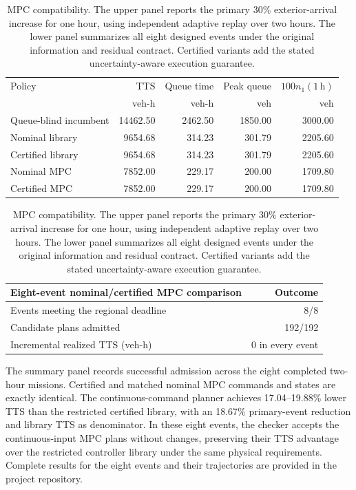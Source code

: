 \documentclass[journal,10pt]{IEEEtran}
\begin{document}
\begin{table}[t]
\centering
\caption{MPC compatibility. The upper panel reports the primary 30\%
exterior-arrival increase for one hour, using independent adaptive replay
over two hours. The lower panel summarizes all eight designed events under
the original information and residual contract. Certified variants add the
stated uncertainty-aware execution guarantee.}
\label{tab:new-incident-primary}
\small
\setlength{\tabcolsep}{4pt}
\begin{tabular}{@{}lrrrr@{}}
\toprule
Policy & TTS & Queue time & Peak queue & $100n_1(1\,\mathrm h)$\\
& veh-h & veh-h & veh & veh\\
\midrule
Queue-blind incumbent & 14462.50 & 2462.50 & 1850.00 & 3000.00\\
Nominal library & 9654.68 & 314.23 & 301.79 & 2205.60\\
Certified library & 9654.68 & 314.23 & 301.79 & 2205.60\\
Nominal MPC & 7852.00 & 229.17 & 200.00 & 1709.80\\
Certified MPC & 7852.00 & 229.17 & 200.00 & 1709.80\\
\bottomrule
\end{tabular}
\par\medskip
\begin{tabular}{@{}lr@{}}
\toprule
Eight-event nominal/certified MPC comparison & Outcome\\
\midrule
Events meeting the regional deadline & 8/8\\
Candidate plans admitted & 192/192\\
Incremental realized TTS (veh-h) & 0 in every event\\
\bottomrule
\end{tabular}
\end{table}

The summary panel records successful admission across the eight completed
two-hour missions. Certified and matched nominal MPC commands and states
are exactly identical. The continuous-command planner
achieves 17.04--19.88\% lower TTS than the restricted certified library,
with an 18.67\% primary-event reduction and library TTS as denominator.
In these eight events, the checker accepts the continuous-input MPC plans
without changes, preserving their TTS advantage over the restricted
controller library under the same physical requirements.
Complete results for the eight events and their trajectories are provided
in the project repository.
\end{document}
